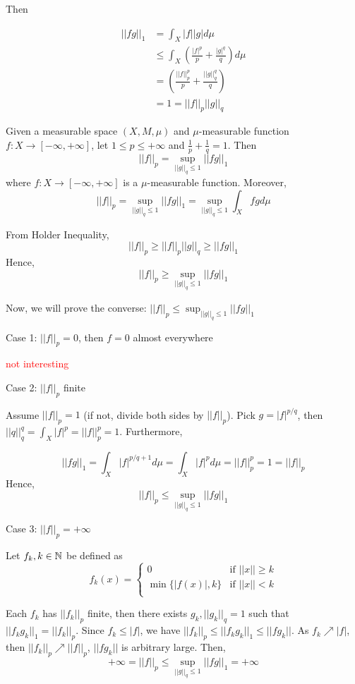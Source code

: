 \documentclass{report}
\begin{document}
Then

\begin{align*}
    ||fg||_1
    &= \int_X |f||g| d\mu \\
    &\leq \int_X \left( \frac{|f|^p}{p} + \frac{|g|^q}{q} \right) d\mu \\
    &= \left( \frac{||f||_p^p}{p} + \frac{||g||_q^q}{q} \right) \\
    &= 1 = ||f||_p ||g||_q
\end{align*}

\begin{theorem}
    Given a measurable space $(X, M, \mu)$ and $\mu$-measurable function $f: X \to [-\infty, +\infty]$, let $1 \leq p \leq +\infty$ and $\frac{1}{p} + \frac{1}{q} = 1$. Then
    \[
        ||f||_p = \sup_{||g||_q \leq 1} ||fg||_1
    \]
    where $f: X \to [-\infty, +\infty]$ is a $\mu$-measurable function. Moreover, 
    \[
        ||f||_p = \sup_{||g||_q \leq 1} ||fg||_1 = \sup_{||g||_q \leq 1} \int_X fg d\mu
    \]
\end{theorem}

From Holder Inequality,
\[
    ||f||_p \geq ||f||_p ||g||_q \geq ||fg||_1
\]
Hence,
\[
    ||f||_p \geq \sup_{||g||_q \leq 1} ||fg||_1
\]

Now, we will prove the converse: $||f||_p \leq \sup_{||g||_q \leq 1} ||fg||_1$

Case 1: $||f||_p = 0$, then $f = 0$ almost everywhere

\textcolor{red}{not interesting}

Case 2: $||f||_p$ finite

Assume $||f||_p = 1$ (if not, divide both sides by $||f||_p$). Pick $g = |f|^{p/q}$, then $||q||_q^q = \int_{X} |f|^{p} = ||f||_p^p = 1$. Furthermore,

\[
    ||fg||_1 = \int_X |f|^{p/q + 1} d\mu = \int_X |f|^p d\mu = ||f||_p^p = 1 = ||f||_p
\]
Hence,
\[
    ||f||_p \leq \sup_{||g||_q \leq 1} ||fg||_1
\]

Case 3: $||f||_p = +\infty$

Let $f_k, k \in \mathbb{N}$ be defined as 
\[
f_k(x) =
\begin{cases}
0 &\text{if $||x|| \geq k$}\\
\min\{|f(x)|, k\} &\text{if $||x|| < k$}\\
\end{cases}
\]

Each $f_k$ has $||f_k||_p$ finite, then there exists $g_k, ||g_k||_q = 1$ such that $||f_k g_k||_1 = ||f_k||_p$. Since $f_k \leq |f|$, we have $||f_k||_p \leq ||f_k g_k||_1 \leq ||f g_k||$. As $f_k \nearrow |f|$, then $||f_k||_p \nearrow ||f||_p$, $||f g_k||$ is arbitrary large. Then, 
\[
    +\infty = ||f||_p \leq \sup_{||g||_q \leq 1} ||fg||_1 = +\infty
\]
\end{document}
